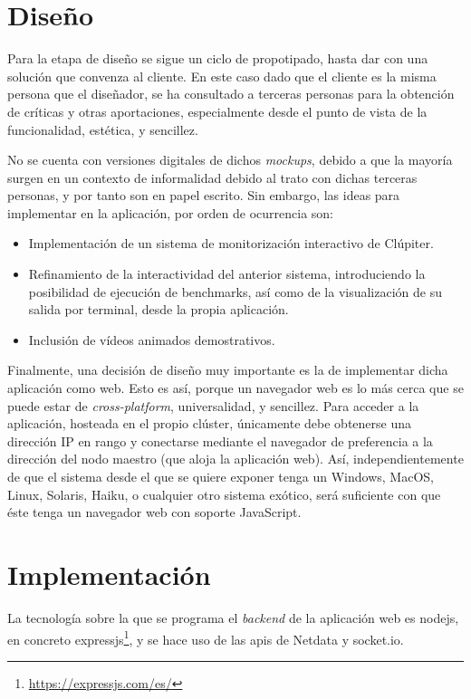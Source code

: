 \section{Diseño}
\label{sec:contenido_didactico__diseño}
Para la etapa de diseño se sigue un ciclo de propotipado, hasta dar con una solución que convenza al cliente. En este caso dado que el cliente es la misma persona que el diseñador, se ha consultado a terceras personas para la obtención de críticas y otras aportaciones, especialmente desde el punto de vista de la funcionalidad, estética, y sencillez.

No se cuenta con versiones digitales de dichos \textit{mockups}, debido a que la mayoría surgen en un contexto de informalidad debido al trato con dichas terceras personas, y por tanto son en papel escrito. Sin embargo, las ideas para implementar en la aplicación, por orden de ocurrencia son:

\begin{itemize}
  \item Implementación de un sistema de monitorización interactivo de Clúpiter.
  \item Refinamiento de la interactividad del anterior sistema, introduciendo la posibilidad de ejecución de benchmarks, así como de la visualización de su salida por terminal, desde la propia aplicación.
  \item Inclusión de vídeos animados demostrativos.
\end{itemize}

Finalmente, una decisión de diseño muy importante es la de implementar dicha aplicación como web. Esto es así, porque un navegador web es lo más cerca que se puede estar de \textit{cross-platform}, universalidad, y sencillez. Para acceder a la aplicación, hosteada en el propio clúster, únicamente debe obtenerse una dirección IP en rango y conectarse mediante el navegador de preferencia a la dirección del nodo maestro (que aloja la aplicación web). Así, independientemente de que el sistema desde el que se quiere exponer tenga un Windows, MacOS, Linux, Solaris, Haiku, o cualquier otro sistema exótico, será suficiente con que éste tenga un navegador web con soporte JavaScript.

\section{Implementación}
La tecnología sobre la que se programa el \textit{\gls{backend}} de la aplicación web es nodejs, en concreto expressjs\footnote{\url{https://expressjs.com/es/}}, y se hace uso de las \acrshort{api}s de Netdata y socket.io.

